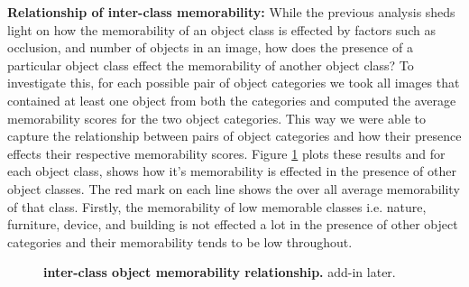 \textbf{Relationship of inter-class memorability:} While the previous analysis sheds light on how the memorability of an object class is effected by factors such as occlusion, and number of objects in an image, how does the presence of a particular object class effect the memorability of another object class? To investigate this, for each possible pair of object categories we took all images that contained at least one object from both the categories and computed the average memorability scores for the two object categories. This way we were able to capture the relationship between pairs of object categories and how their presence effects their respective memorability scores. Figure \ref{fig:obLabelPair} plots these results and for each object class, shows how it's memorability is effected in the presence of other object classes. The red mark on each line shows the over all average memorability of that class. Firstly, the memorability of low memorable classes i.e. nature, furniture, device, and building is not effected a lot in the presence of other object categories and their memorability tends to be low throughout. 

\begin{figure}[h]
\centering
{}
\vspace{-5mm}\caption{\footnotesize\textbf{inter-class object memorability relationship.} add-in later. }\label{fig:obLabelPair}
\end{figure}